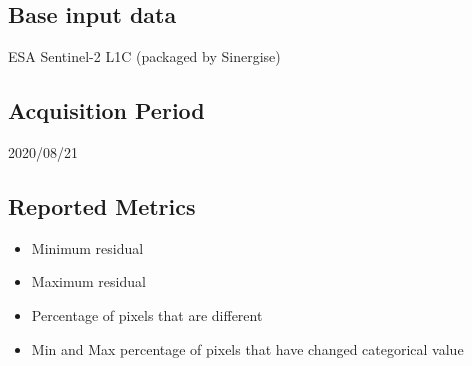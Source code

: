 \documentclass[a4paper]{article}
\begin{document}
    \subsection{Base input data}

      ESA Sentinel-2 L1C (packaged by Sinergise)

    \subsection{Acquisition Period}

      2020/08/21

    \subsection{Reported Metrics}
      \begin{itemize}
        \item Minimum residual
        \item Maximum residual
        \item Percentage of pixels that are different
        \item Min and Max percentage of pixels that have changed categorical value
      \end{itemize}
\end{document}
